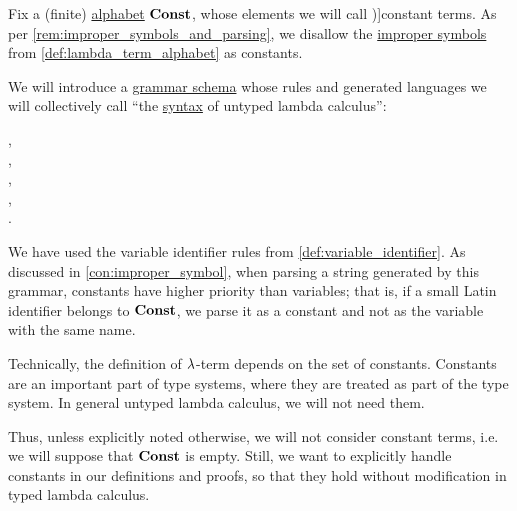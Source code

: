 \begin{definition}\label{def:lambda_term}\mimprovised
  Fix a (finite) \hyperref[def:formal_language/alphabet]{alphabet} \( \op*{Const} \), whose elements we will call \term[en=constant (\cite[202]{Andrews2002Logic})]{constant terms}. As per \cref{rem:improper_symbols_and_parsing}, we disallow the \hyperref[con:improper_symbol]{improper symbols} from \cref{def:lambda_term_alphabet} as constants.

  We will introduce a \hyperref[def:formal_grammar/schema]{grammar schema} whose rules and generated languages we will collectively call \enquote{the \hyperref[con:syntax_semantics_duality]{syntax} of untyped lambda calculus}:
  \begin{bnf*}
        {}, \\
            { \bnfor {}}, \\
     {\bnftsq{\( ( \)} \bnfsp {} \bnfsp {} \bnfsp \bnftsq{\( ) \)}}, \\
     {\bnftsq{\( ( \)} \bnfsp \bnftsq{\( \synlambda \)} \bnfsp {} \bnfsp {} \bnfsp {} \bnfsp \bnftsq{\( ) \)}}, \\
            { \bnfor {} \bnfor {}}.
  \end{bnf*}

  We have used the variable identifier rules from \cref{def:variable_identifier}. As discussed in \cref{con:improper_symbol}, when parsing a string generated by this grammar, constants have higher priority than variables; that is, if a small Latin identifier belongs to \( \op*{Const} \), we parse it as a constant and not as the variable with the same name.

  \begin{thmenum}
     Technically, the definition of \( {\mathrm \lambda} \)-term depends on the set of constants. Constants are an important part of type systems, where they are treated as part of the type system. In general untyped lambda calculus, we will not need them.

    Thus, unless explicitly noted otherwise, we will not consider constant terms, i.e. we will suppose that \( \op*{Const} \) is empty. Still, we want to explicitly handle constants in our definitions and proofs, so that they hold without modification in typed lambda calculus.


\end{thmenum}
\end{definition}
